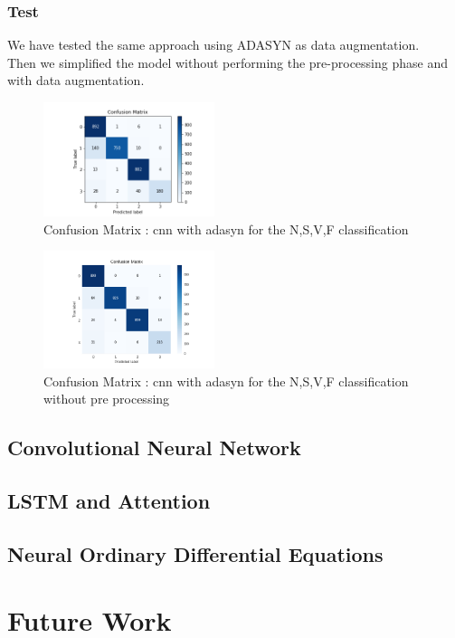 \documentclass[LaM,binding=0.6cm]{sapthesis}
\begin{document}
\subsection{Test}
We have tested the same approach using ADASYN as data augmentation.\\Then we simplified the model without performing the pre-processing phase and with data augmentation.
\begin{figure}[H]
	\includegraphics[width=50mm,scale=0.7]{conf-matrixADASYNdtrk-model.png}
	\caption{Confusion Matrix : cnn with adasyn for the N,S,V,F classification}
	\label{fig: cnn2}
\end{figure}
\begin{figure}[H]
	\includegraphics[width=50mm,scale=0.7]{conf-matrix-no-pre-proc-adssyn.png}
	\caption{Confusion Matrix : cnn with adasyn for the N,S,V,F classification without pre processing}
	\label{fig: cnn4}
\end{figure}







\section{Convolutional Neural Network}
\section{LSTM and Attention}
\section{Neural Ordinary Differential Equations}
\chapter{Future Work}


\backmatter
\cleardoublepage
{}
\end{document}

